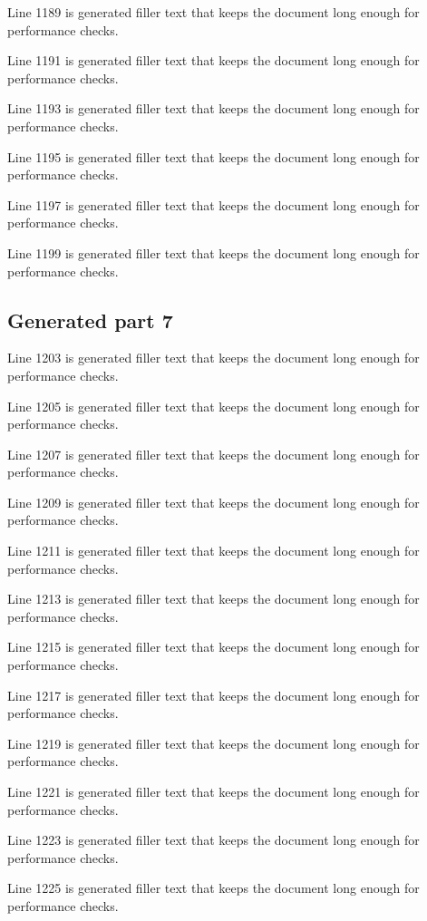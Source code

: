 Line 1189 is generated filler text that keeps the document long enough for performance checks.

Line 1191 is generated filler text that keeps the document long enough for performance checks.

Line 1193 is generated filler text that keeps the document long enough for performance checks.

Line 1195 is generated filler text that keeps the document long enough for performance checks.

Line 1197 is generated filler text that keeps the document long enough for performance checks.

Line 1199 is generated filler text that keeps the document long enough for performance checks.

\subsection{Generated part 7}

Line 1203 is generated filler text that keeps the document long enough for performance checks.

Line 1205 is generated filler text that keeps the document long enough for performance checks.

Line 1207 is generated filler text that keeps the document long enough for performance checks.

Line 1209 is generated filler text that keeps the document long enough for performance checks.

Line 1211 is generated filler text that keeps the document long enough for performance checks.

Line 1213 is generated filler text that keeps the document long enough for performance checks.

Line 1215 is generated filler text that keeps the document long enough for performance checks.

Line 1217 is generated filler text that keeps the document long enough for performance checks.

Line 1219 is generated filler text that keeps the document long enough for performance checks.

Line 1221 is generated filler text that keeps the document long enough for performance checks.

Line 1223 is generated filler text that keeps the document long enough for performance checks.

Line 1225 is generated filler text that keeps the document long enough for performance checks.

